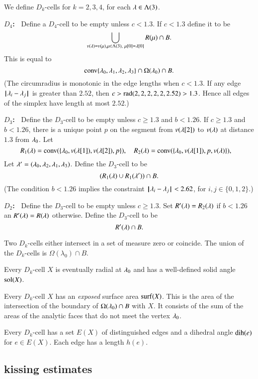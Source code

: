 We define $D_k$-cells for $k=2,3,4$, for each $\lambda\in\Lambda(3)$.

{\bf $D_4$:~}  Define a $D_4$-cell to be empty unless $c<1.3$.  If $c<1.3$ define it to be
  $$
  \bigcup_{v(\lambda)=v(\mu), \mu\in \Lambda(3),\ \mu[0]=\lambda[0]}  R(\mu)\cap B.
$$
This is equal to
$$
{\operatorname{conv}}\{\lambda_0,\lambda_1,\lambda_2,\lambda_3\} \cap \Omega(\lambda_0)\cap B.
$$
(The circumradius is monotonic in the edge lengths when $c<1.3$.
If any edge ${\hskip0.1em|\hskip-0.15em|\hskip0.1em}\lambda_i - \lambda_j{\hskip0.1em|\hskip-0.15em|\hskip0.1em}$ is greater than $2.52$, then
$c > {\operatorname{rad}}(2,2,2,2,2,2.52) > 1.3$.  Hence all edges of the simplex have length at most $2.52$.)

{\bf $D_3$:~} Define the $D_3$-cell to be empty unless $c\ge 1.3$ and $b< 1.26$.  If $c \ge 1.3$ and $b< 1.26$, there is a unique point $p$
on the segment from $v(\lambda[2])$ to $v(\lambda)$ at distance $1.3$ from $\lambda_0$.  Let 
$$
R_1(\lambda) = {\operatorname{conv}}(\{\lambda_0,v(\lambda[1]),v(\lambda[2]),p\} ),\quad
R_2(\lambda) = {\operatorname{conv}}(\{\lambda_0,v(\lambda[1]),p,v(\lambda)\} ),\quad
$$
Let $\lambda' = (\lambda_0,\lambda_2,\lambda_1,\lambda_3)$.
Define the $D_3$-cell to be
$$
(R_1(\lambda) \cup R_1(\lambda'))\cap B.
$$
(The condition $b< 1.26$ implies the constraint ${\hskip0.1em|\hskip-0.15em|\hskip0.1em}\lambda_i - \lambda_j{\hskip0.1em|\hskip-0.15em|\hskip0.1em}< 2.62$, for $i,j\in\{0,1,2\}$.)

{\bf $D_2$:~} Define the $D_3$-cell to be empty unless $c\ge 1.3$.
Set $R'(\lambda) = R_2(\lambda)$ if $b< 1.26$ an $R'(\lambda) = R(\lambda)$
otherwise.  Define the $D_3$-cell to be
$$
R'(\lambda) \cap B.
$$

\begin{lemma}  Two $D_k$-cells either intersect in a set of measure zero or coincide.  The union of the $D_k$-cells is $\Omega(\lambda_0)\cap B$.
\end{lemma}

Every $D_k$-cell $X$ is eventually radial at $\lambda_0$ and has
a well-defined solid angle $\operatorname{sol}(X)$.

Every $D_k$-cell $X$ has an {\it exposed} surface area ${\operatorname{surf}}(X)$.
This is the area of the intersection of the boundary of 
$\Omega(\lambda_0)\cap B$ with $X$.  It consists of the sum of the
areas of the analytic faces that do not meet the vertex $\lambda_0$.

Every $D_k$-cell has a set $E(X)$ of distinguished edges and a dihedral angle $\operatorname{dih}(e)$ for $e\in E(X)$.  Each edge has a length $h(e)$.

\subsection{kissing estimates}

